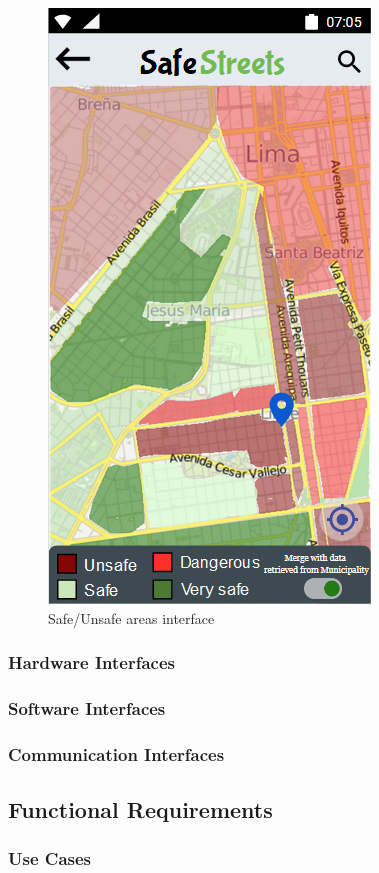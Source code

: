        \begin{figure}[h]
        \centering
        \includegraphics[scale=0.9]{Images/safe_unsafe.png}
        \caption{Safe/Unsafe areas interface}
    \end{figure}
    \newpage
\subsubsection{Hardware Interfaces}

\subsubsection{Software Interfaces}

\subsubsection{Communication Interfaces}

\subsection{Functional Requirements}
\subsubsection{Use Cases}


